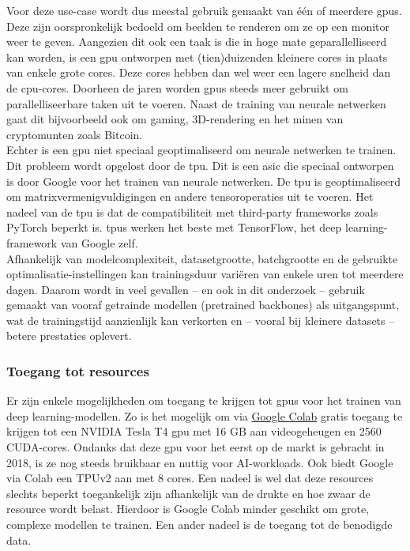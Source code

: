 Voor deze use-case wordt dus meestal gebruik gemaakt van één of meerdere \glspl{gpu}. Deze zijn oorspronkelijk bedoeld om beelden te renderen om ze op een monitor weer te geven. Aangezien dit ook een taak is die in hoge mate geparallelliseerd kan worden, is een \gls{gpu} ontworpen met (tien)duizenden kleinere cores in plaats van enkele grote cores. Deze cores hebben dan wel weer een lagere snelheid dan de \gls{cpu}-cores. Doorheen de jaren worden \glspl{gpu} steeds meer gebruikt om parallelliseerbare taken uit te voeren. Naast de training van neurale netwerken gaat dit bijvoorbeeld ook om gaming, 3D-rendering en het minen van cryptomunten zoals Bitcoin. \autocite{Anish_Dev_2014} \\

Echter is een \gls{gpu} niet speciaal geoptimaliseerd om neurale netwerken te trainen. Dit probleem wordt opgelost door de \gls{tpu}. Dit is een \gls{asic} die speciaal ontworpen is door Google voor het trainen van neurale netwerken. De \gls{tpu} is geoptimaliseerd om matrixvermenigvuldigingen en andere tensoroperaties uit te voeren. \autocite{Jouppi_2017} Het nadeel van de \gls{tpu} is dat de compatibiliteit met third-party frameworks zoals PyTorch beperkt is. \glspl{tpu} werken het beste met TensorFlow, het deep learning-framework van Google zelf. \autocite{Wang_2019} \\

Afhankelijk van modelcomplexiteit, datasetgrootte, batchgrootte en de gebruikte optimalisatie-instellingen kan trainingsduur variëren van enkele uren tot meerdere dagen. Daarom wordt in veel gevallen -- en ook in dit onderzoek -- gebruik gemaakt van vooraf getrainde modellen (pretrained backbones) als uitgangspunt, wat de trainingstijd aanzienlijk kan verkorten en -- vooral bij kleinere datasets -- betere prestaties oplevert. \\

\subsubsection{Toegang tot resources}

Er zijn enkele mogelijkheden om toegang te krijgen tot \glspl{gpu} voor het trainen van deep learning-modellen. Zo is het mogelijk om via \href{https://colab.research.google.com/}{Google Colab} gratis toegang te krijgen tot een NVIDIA Tesla T4 \gls{gpu} met 16 GB aan videogeheugen en 2560 CUDA-cores. \autocite{TechPowerUp_Tesla-T4} Ondanks dat deze \gls{gpu} voor het eerst op de markt is gebracht in 2018, is ze nog steeds bruikbaar en nuttig voor AI-workloads. Ook biedt Google via Colab een TPUv2 aan met 8 cores. Een nadeel is wel dat deze resources slechts beperkt toegankelijk zijn afhankelijk van de drukte en hoe zwaar de resource wordt belast. Hierdoor is Google Colab minder geschikt om grote, complexe modellen te trainen. Een ander nadeel is de toegang tot de benodigde data. \\

